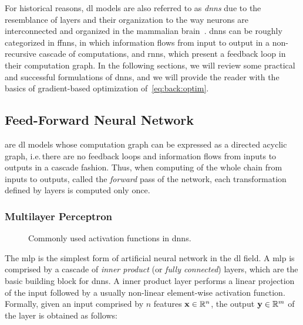 For historical reasons, \gls{dl} models are also referred to as \emph{\glspl{dnn}} due to the resemblance of layers and their organization to the way neurons are interconnected and organized in the mammalian brain~\cite{}.
\Glspl{dnn} can be roughly categorized in \glspl{ffnn}, in which information flows from input to output in a non-recursive cascade of computations, and \glspl{rnn}, which present a feedback loop in their computation graph.
In the following sections, we will review some practical and successful formulations of \glspl{dnn},
and we will provide the reader with the basics of gradient-based optimization of~\eqref{eq:back:optim}.

\subsection{Feed-Forward Neural Network}
\label{subsec:back:ffnn}

 are \gls{dl} models whose computation graph can be expressed as a directed acyclic graph, i.e.\,there are no feedback loops and information flows from inputs to outputs in a cascade fashion.
Thus, when computing of the whole chain from inputs to outputs, called the \emph{forward} pass of the network, each transformation defined by layers is computed only once.


\subsubsection{Multilayer Perceptron}

\begin{figure}
    \caption{Commonly used activation functions in \glspl{dnn}.}
    \label{fig:back:activations}
\end{figure}

The \gls{mlp} is the simplest form of artificial neural network in the \Acrlong{dl} field.
A \gls{mlp} is comprised by a cascade of \emph{inner product} (or \emph{fully connected}) layers, which are the basic building block for \glspl{dnn}.
A inner product layer performs a linear projection of the input followed by a usually non-linear element-wise activation function.
Formally, given an input comprised by $n$ features $\mathbf{x} \in \mathbb{R}^n$, the output  $\mathbf{y} \in \mathbb{R}^m$ of the layer is obtained as follows:

